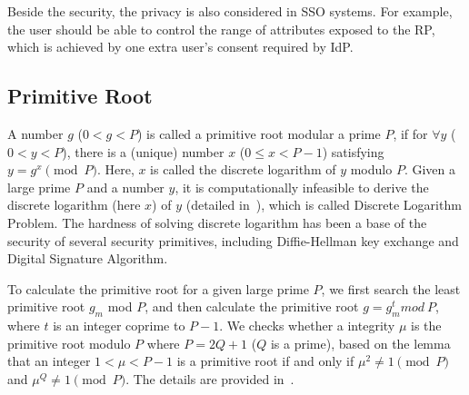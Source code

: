 Beside the security, the privacy is also considered in SSO systems. For example, the user should be able to control the range of attributes exposed to the RP, which is achieved by one extra user's consent required by IdP.

\subsection{Primitive Root}
\label{subsec:primitive}
A number $g$ ($0<g<P$) is called a primitive root modular a prime $P$, if for ${\forall}y$ ($0<y<P$), there is a (unique) number $x$ ($0\le x <P-1$) satisfying $y=g^x \pmod P$. Here, $x$ is called the discrete logarithm of $y$ modulo $P$. Given a large prime $P$ and a number $y$, it is computationally infeasible to derive the discrete logarithm (here $x$) of $y$ (detailed in~\cite{WXWM}), which is called  Discrete Logarithm Problem. The hardness of solving discrete logarithm has been a base of the security of several security primitives, including
Diffie-Hellman key exchange and Digital Signature Algorithm.

To calculate the primitive root for a given large prime $P$,  we first search the least primitive root $g_m$  mod $P$, and then calculate the primitive root $g = g_{m}^{t} mod \ P$, where $t$ is an integer coprime to $P-1$.
We checks whether a integrity $\mu$ is the primitive root modulo $P$ where $P=2Q+1$ ($Q$ is a prime), based on the lemma that an integer $1<\mu <P-1$ is a primitive root if and only if $\mu^2\neq 1 \pmod P$ and $\mu^Q\neq 1 \pmod P$.
The details are provided in~\cite{Shoup,Wang}.



